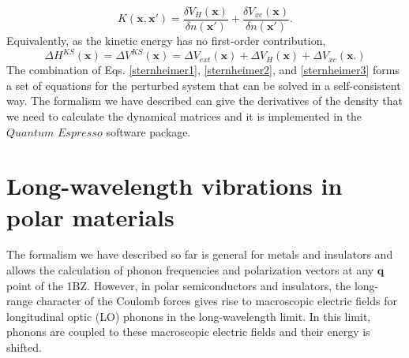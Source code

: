 \begin{equation}
 K(\mathbf{x},\mathbf{x}')=\frac{\delta V_{H}(\mathbf{x})}{\delta n(\mathbf{x}')}+\frac{\delta V_{xc}(\mathbf{x})}{\delta n(\mathbf{x}')}.
\end{equation}
Equivalently, as the kinetic energy has no first-order contribution,
\begin{equation}
 \Delta H^{KS}(\mathbf{x})=\Delta V^{KS}(\mathbf{x})=\Delta V_{ext}(\mathbf{x})+\Delta V_{H}(\mathbf{x})+\Delta V_{xc}(\mathbf{x}.)
\end{equation}
The combination of Eqs. \ref{sternheimer1}, \ref{sternheimer2}, and \ref{sternheimer3} forms a set of equations for the perturbed system that can be solved in a self-consistent way. The formalism we have 
described can give the derivatives of the density that we need to calculate the dynamical matrices and it is implemented in the $Quantum$ $Espresso$ software package\cite{giannozzi2009quantum}.

\section{Long-wavelength vibrations in polar materials}

The formalism we have described so far is general for metals and insulators and allows the calculation of phonon frequencies and polarization vectors at any $\mathbf{q}$ point of the 1BZ. However, in polar 
semiconductors and insulators, the long-range character of the Coulomb forces gives rise to macroscopic electric fields for longitudinal optic (LO) phonons in the long-wavelength limit. In this limit, phonons 
are coupled to these macroscopic electric fields and their energy is shifted. \\

